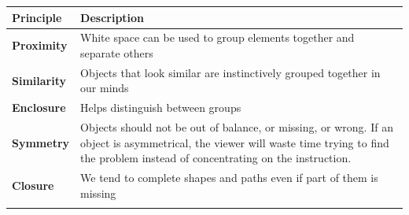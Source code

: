 \documentclass[]{book}
\begin{document}
\begin{longtable}[]{@{}ll@{}}
\toprule
\begin{minipage}[b]{0.15\columnwidth}\raggedright
\textbf{Principle}\strut
\end{minipage} & \begin{minipage}[b]{0.79\columnwidth}\raggedright
\textbf{Description}\strut
\end{minipage}\tabularnewline
\midrule
\endhead
\begin{minipage}[t]{0.15\columnwidth}\raggedright
\textbf{Proximity}\strut
\end{minipage} & \begin{minipage}[t]{0.79\columnwidth}\raggedright
White space can be used to group elements together and separate others\strut
\end{minipage}\tabularnewline
\begin{minipage}[t]{0.15\columnwidth}\raggedright
\textbf{Similarity}\strut
\end{minipage} & \begin{minipage}[t]{0.79\columnwidth}\raggedright
Objects that look similar are instinctively grouped together in our minds\strut
\end{minipage}\tabularnewline
\begin{minipage}[t]{0.15\columnwidth}\raggedright
\textbf{Enclosure}\strut
\end{minipage} & \begin{minipage}[t]{0.79\columnwidth}\raggedright
Helps distinguish between groups\strut
\end{minipage}\tabularnewline
\begin{minipage}[t]{0.15\columnwidth}\raggedright
\textbf{Symmetry}\strut
\end{minipage} & \begin{minipage}[t]{0.79\columnwidth}\raggedright
Objects should not be out of balance, or missing, or wrong. If an object is asymmetrical, the viewer will waste time trying to find the problem instead of concentrating on the instruction.\strut
\end{minipage}\tabularnewline
\begin{minipage}[t]{0.15\columnwidth}\raggedright
\textbf{Closure}\strut
\end{minipage} & \begin{minipage}[t]{0.79\columnwidth}\raggedright
We tend to complete shapes and paths even if part of them is missing\strut
\end{minipage}\tabularnewline
\begin{minipage}[t]{0.15\columnwidth}\raggedright

\end{minipage}
\end{longtable}
\end{document}
